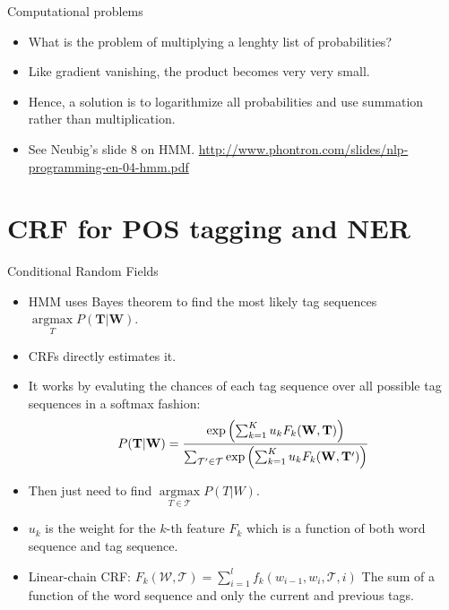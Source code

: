 \documentclass[11pt, handout]{beamer}
\newcommand{\argmaxF}{\mathop{\mathrm{argmax}}\limits}
\begin{document}
\begin{frame}{Computational problems}
  \begin{itemize}[<+->]
    \item What is the problem of multiplying a lenghty list of probabilities? 
    \item Like gradient vanishing, the product becomes very very small. 
    \item Hence, a solution is to logarithmize all probabilities and use summation rather than multiplication.  
    \item See Neubig's slide 8 on HMM. \url{http://www.phontron.com/slides/nlp-programming-en-04-hmm.pdf} 
  \end{itemize}
\end{frame}

\section{CRF for POS tagging and NER}

\begin{frame}{Conditional Random Fields}
  \begin{itemize}[<+->]
    \item HMM uses Bayes theorem to find the most likely tag sequences $\argmaxF_T P(\mathbf{T}|\mathbf{W})$. 
    \item CRFs directly estimates it. 
    \item It works by evaluting the chances of each tag sequence over all possible tag sequences in a softmax fashion: 
    $$ P(\mathbf{T}|\mathbf{W}) = 
    {
    {\exp \left (  \sum_{k=1}^K u_k F_k(\mathbf{W}, \mathbf{T})  \right ) }
    \over
    {\sum_{\mathcal{T'} \in \mathcal{T}}
    \exp \left (  \sum_{k=1}^K u_k F_k(\mathbf{W}, \mathbf{T'})  \right ) }
    }
    $$
    \item Then just need to find $\argmaxF_{T\in \mathcal{T}} P(T|W)$. 
    \item $u_k$ is the weight for the $k$-th feature $F_k$ which is a function of both word sequence and tag sequence. 
    \item Linear-chain CRF: $F_k(\mathcal{W}, \mathcal{T}) = \sum_{i=1}^l f_k(w_{i-1}, w_i, \mathcal{T}, i)$ The sum of a function of the word sequence and only the current and previous tags. 
  \end{itemize}
\end{frame}
\end{document}
